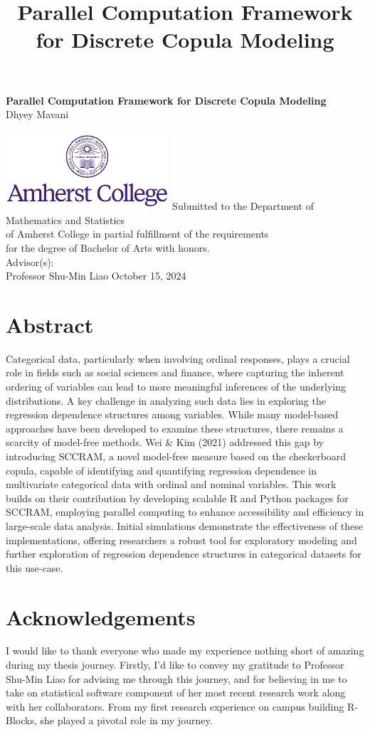 \documentclass[
  11pt,
  letterpaper,
  twoside]{report}
\title{Parallel Computation Framework for Discrete Copula Modeling}
\renewcommand*\contentsname{Table of contents}
\newcommand\contentsname{Table of contents}
\def\maketitle{
\pagenumbering{roman}
{\thispagestyle{empty}%
  \null\vskip 1in
  \begin{center}\fontsize{24}{28}\sf
     \textbf{Parallel Computation Framework for Discrete Copula
Modeling}\\[2cm]
     \fontsize{18}{20}\sf Dhyey Mavani\\[0.2cm]
     
     \vfill
     
     \includegraphics[height=1.15in]{includes/Amherst-College-wordmark-seal-centered-purple-RGB-900px.png}
     \vskip 0.5in
     \fontsize{13}{15}\sf Submitted to the Department of Mathematics and
Statistics\\
     of Amherst College in partial fulfillment of the requirements \\
     for the degree of Bachelor of Arts with honors.\\
     \vskip 0.5in
     Advisor(s):\\
     \fontsize{13}{15}\sf Professor Shu-Min Liao
    \vskip 0.5in
    October 15, 2024
  \end{center}
  \newpage\mbox{}\thispagestyle{empty}\newpage
}
}
\begin{document}
\maketitle

\renewcommand*\contentsname{Table of contents}
{
\hypersetup{linkcolor=}
\setcounter{tocdepth}{1}
\tableofcontents
}


\chapter*{Abstract}\label{abstract}


Categorical data, particularly when involving ordinal responses, plays a
crucial role in fields such as social sciences and finance, where
capturing the inherent ordering of variables can lead to more meaningful
inferences of the underlying distributions. A key challenge in analyzing
such data lies in exploring the regression dependence structures among
variables. While many model-based approaches have been developed to
examine these structures, there remains a scarcity of model-free
methods. Wei \& Kim (2021) addressed this gap by introducing SCCRAM, a
novel model-free measure based on the checkerboard copula, capable of
identifying and quantifying regression dependence in multivariate
categorical data with ordinal and nominal variables. This work builds on
their contribution by developing scalable R and Python packages for
SCCRAM, employing parallel computing to enhance accessibility and
efficiency in large-scale data analysis. Initial simulations demonstrate
the effectiveness of these implementations, offering researchers a
robust tool for exploratory modeling and further exploration of
regression dependence structures in categorical datasets for this
use-case.


\chapter*{Acknowledgements}\label{acknowledgements}


I would like to thank everyone who made my experience nothing short of
amazing during my thesis journey. Firstly, I'd like to convey my
gratitude to Professor Shu-Min Liao for advising me through this
journey, and for believing in me to take on statistical software
component of her most recent research work along with her collaborators.
From my first research experience on campus building R-Blocks, she
played a pivotal role in my journey.
\end{document}
